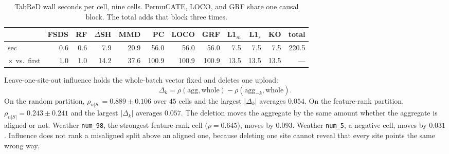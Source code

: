 \begin{table}[t]
\centering
\small
\caption{TabReD wall seconds per cell, nine cells.
PermuCATE, LOCO, and GRF share one causal block.
The total adds that block three times.}
\label{tab:tabred-eff}
\begin{tabular}{@{}l *{11}{r}@{}}
\toprule
 & FSDS & RF & \(\Delta\)SH & MMD & PC & LOCO & GRF & L1\(_m\) & L1\(_s\) & KO & total \\
\midrule
sec & 0.6 & 0.6 & 7.9 & 20.9 & 56.0 & 56.0 & 56.0 & 7.5 & 7.5 & 7.5 & 220.5 \\
\(\times\) vs.\ first & 1.0 & 1.0 & 14.2 & 37.6 & 100.9 & 100.9 & 100.9 & 13.5 & 13.5 & 13.5 & --- \\
\bottomrule
\end{tabular}
\end{table}

Leave-one-site-out influence holds the whole-batch vector fixed and
deletes one upload:
\[
\Delta_k=\rho(\mathrm{agg},\mathrm{whole})-\rho(\mathrm{agg}_{-k},\mathrm{whole}).
\]
On the random partition, \(\rho_{n|S|}=0.889\pm 0.106\) over \(45\) cells
and the largest \(|\Delta_k|\) averages \(0.054\).
On the feature-rank partition, \(\rho_{n|S|}=0.243\pm 0.241\) and the
largest \(|\Delta_k|\) averages \(0.057\).
The deletion moves the aggregate by the same amount whether the aggregate
is aligned or not.
Weather \texttt{num\_98}, the strongest feature-rank cell
(\(\rho=0.645\)), moves by \(0.093\).
Weather \texttt{num\_5}, a negative cell, moves by \(0.031\).
Influence does not rank a misaligned split above an aligned one, because
deleting one site cannot reveal that every site points the same wrong way.

